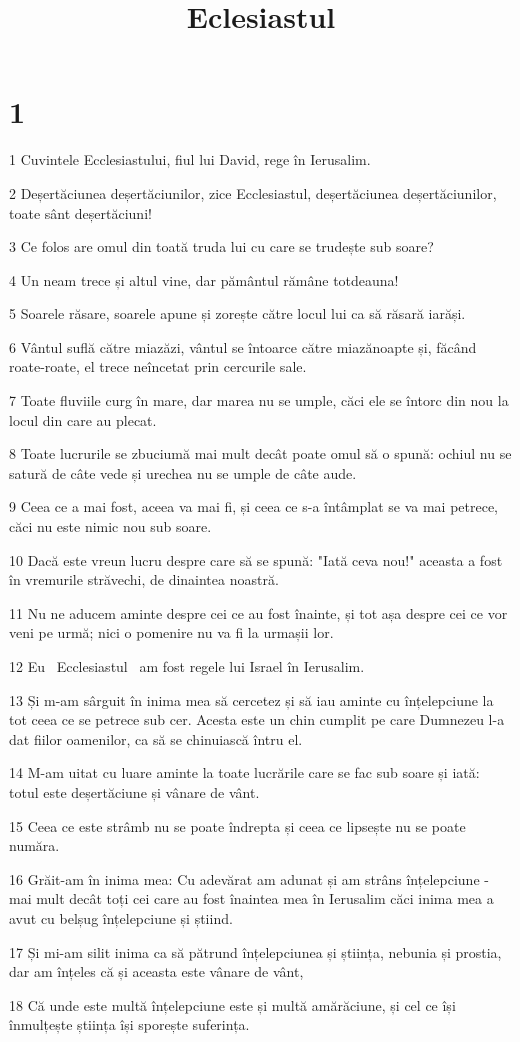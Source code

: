 

\title{Eclesiastul}


\chapter{1}

\par 1 Cuvintele Ecclesiastului, fiul lui David, rege în Ierusalim.
\par 2 Deșertăciunea deșertăciunilor, zice Ecclesiastul, deșertăciunea deșertăciunilor, toate sânt deșertăciuni!
\par 3 Ce folos are omul din toată truda lui cu care se trudește sub soare?
\par 4 Un neam trece și altul vine, dar pământul rămâne totdeauna!
\par 5 Soarele răsare, soarele apune și zorește către locul lui ca să răsară iarăși.
\par 6 Vântul suflă către miazăzi, vântul se întoarce către miazănoapte și, făcând roate-roate, el trece neîncetat prin cercurile sale.
\par 7 Toate fluviile curg în mare, dar marea nu se umple, căci ele se întorc din nou la locul din care au plecat.
\par 8 Toate lucrurile se zbuciumă mai mult decât poate omul să o spună: ochiul nu se satură de câte vede și urechea nu se umple de câte aude.
\par 9 Ceea ce a mai fost, aceea va mai fi, și ceea ce s-a întâmplat se va mai petrece, căci nu este nimic nou sub soare.
\par 10 Dacă este vreun lucru despre care să se spună: "Iată ceva nou!" aceasta a fost în vremurile străvechi, de dinaintea noastră.
\par 11 Nu ne aducem aminte despre cei ce au fost înainte, și tot așa despre cei ce vor veni pe urmă; nici o pomenire nu va fi la urmașii lor.
\par 12 Eu  Ecclesiastul  am fost regele lui Israel în Ierusalim.
\par 13 Și m-am sârguit în inima mea să cercetez și să iau aminte cu înțelepciune la tot ceea ce se petrece sub cer. Acesta este un chin cumplit pe care Dumnezeu l-a dat fiilor oamenilor, ca să se chinuiască întru el.
\par 14 M-am uitat cu luare aminte la toate lucrările care se fac sub soare și iată: totul este deșertăciune și vânare de vânt.
\par 15 Ceea ce este strâmb nu se poate îndrepta și ceea ce lipsește nu se poate număra.
\par 16 Grăit-am în inima mea: Cu adevărat am adunat și am strâns înțelepciune - mai mult decât toți cei care au fost înaintea mea în Ierusalim căci inima mea a avut cu belșug înțelepciune și știind.
\par 17 Și mi-am silit inima ca să pătrund înțelepciunea și știința, nebunia și prostia, dar am înțeles că și aceasta este vânare de vânt,
\par 18 Că unde este multă înțelepciune este și multă amărăciune, și cel ce își înmulțește știința își sporește suferința.

